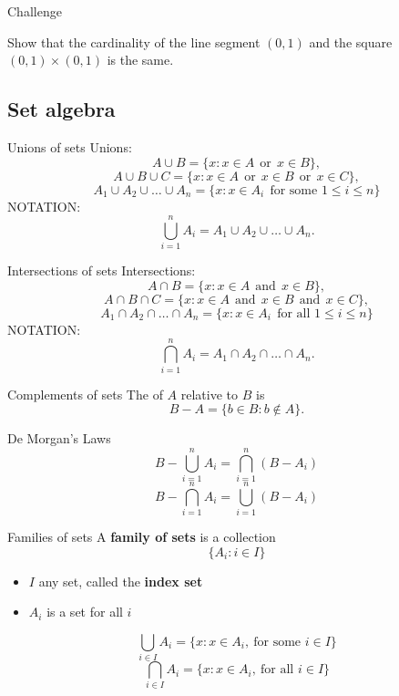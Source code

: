 \documentclass{beamer}
\begin{document}
\begin{frame}{Challenge}
\begin{prob}
Show that the cardinality of the line segment $(0,1)$ and the square $(0,1)\times (0,1)$ is the same.
\end{prob}
\end{frame}

\subsection{Set algebra}

\begin{frame}{Unions of sets}
Unions:
\pause
$$A\cup B = \{x: x\in A\ \ \text{or}\ \ x\in B\},$$
\pause
$$A\cup B\cup C = \{x: x\in A\ \ \text{or}\ \ x\in B\ \ \text{or}\ \ x\in C\},$$
\pause
$$A_1\cup A_2\cup \dots \cup A_n = \{x: x\in A_i\ \ \text{for some $1\leq i\leq n$}\}$$
\pause
{\color{red}NOTATION:}
$$\bigcup_{i=1}^n A_i = A_1\cup A_2\cup \dots \cup A_n.$$
\end{frame}

\begin{frame}{Intersections of sets}
Intersections:
\pause
$$A\cap B = \{x: x\in A\ \ \text{and}\ \ x\in B\},$$
\pause
$$A\cap B\cap C = \{x: x\in A\ \ \text{and}\ \ x\in B\ \ \text{and}\ \ x\in C\},$$
\pause
$$A_1\cap A_2\cap \dots \cap A_n = \{x: x\in A_i\ \ \text{for all $1\leq i\leq n$}\}$$
\pause
{\color{red}NOTATION:}
$$\bigcap_{i=1}^n A_i = A_1\cap A_2\cap \dots \cap A_n.$$
\end{frame}

\begin{frame}{Complements of sets}
\pause
The  of $A$ relative to $B$ is
$$B-A = \{b\in B: b\notin A\}.$$
\pause
\begin{thm}{De Morgan's Laws}
\pause
$$B-\bigcup_{i=1}^n A_i = \bigcap_{i=1}^n (B-A_i)$$
\pause
$$B-\bigcap_{i=1}^n A_i = \bigcup_{i=1}^n (B-A_i)$$
\end{thm}
\end{frame}


\begin{frame}{Families of sets}
A \textbf{family of sets} is a collection
$$\{A_i: i\in I\}$$
\begin{itemize}
\pause
\item $I$ any set, called the \textbf{index set}
\pause
\item $A_i$ is a set for all $i$
\end{itemize}
\pause
$$\bigcup_{i\in I} A_i = \{x: x\in A_i,\ \text{for some $i\in I$}\}$$
\pause
$$\bigcap_{i\in I} A_i = \{x: x\in A_i,\ \text{for all $i\in I$}\}$$
\end{frame}
\end{document}

